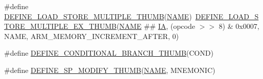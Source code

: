 \begin{DoxyCompactItemize}
\item 
\#define \mbox{\hyperlink{decoder-thumb_8c_a8d5163bce6b6db3dfdf601fc1a5d0e0c}{D\+E\+F\+I\+N\+E\+\_\+\+L\+O\+A\+D\+\_\+\+S\+T\+O\+R\+E\+\_\+\+M\+U\+L\+T\+I\+P\+L\+E\+\_\+\+T\+H\+U\+MB}}(\mbox{\hyperlink{inflate_8h_a164ea0159d5f0b5f12a646f25f99eceaa67bc2ced260a8e43805d2480a785d312}{N\+A\+ME}})~\mbox{\hyperlink{decoder-thumb_8c_aaa81a7373807ab43c5b56789bf6628ea}{D\+E\+F\+I\+N\+E\+\_\+\+L\+O\+A\+D\+\_\+\+S\+T\+O\+R\+E\+\_\+\+M\+U\+L\+T\+I\+P\+L\+E\+\_\+\+E\+X\+\_\+\+T\+H\+U\+MB}}(\mbox{\hyperlink{inflate_8h_a164ea0159d5f0b5f12a646f25f99eceaa67bc2ced260a8e43805d2480a785d312}{N\+A\+ME}} \#\# \mbox{\hyperlink{isa-thumb_8c_a3048b70ae3e6d982e60f063bd78fda51}{IA}}, (opcode $>$$>$ 8) \& 0x0007, N\+A\+M\+E, A\+R\+M\+\_\+\+M\+E\+M\+O\+R\+Y\+\_\+\+I\+N\+C\+R\+E\+M\+E\+N\+T\+\_\+\+A\+F\+T\+E\+R, 0)
\item 
\#define \mbox{\hyperlink{decoder-thumb_8c_ae98e90d8562d44b0a917b60365c03672}{D\+E\+F\+I\+N\+E\+\_\+\+C\+O\+N\+D\+I\+T\+I\+O\+N\+A\+L\+\_\+\+B\+R\+A\+N\+C\+H\+\_\+\+T\+H\+U\+MB}}(C\+O\+ND)
\item 
\#define \mbox{\hyperlink{decoder-thumb_8c_a2c95e7ce4f433fd8c88c4847461abd28}{D\+E\+F\+I\+N\+E\+\_\+\+S\+P\+\_\+\+M\+O\+D\+I\+F\+Y\+\_\+\+T\+H\+U\+MB}}(\mbox{\hyperlink{inflate_8h_a164ea0159d5f0b5f12a646f25f99eceaa67bc2ced260a8e43805d2480a785d312}{N\+A\+ME}},  M\+N\+E\+M\+O\+N\+IC)
\end{DoxyCompactItemize}
